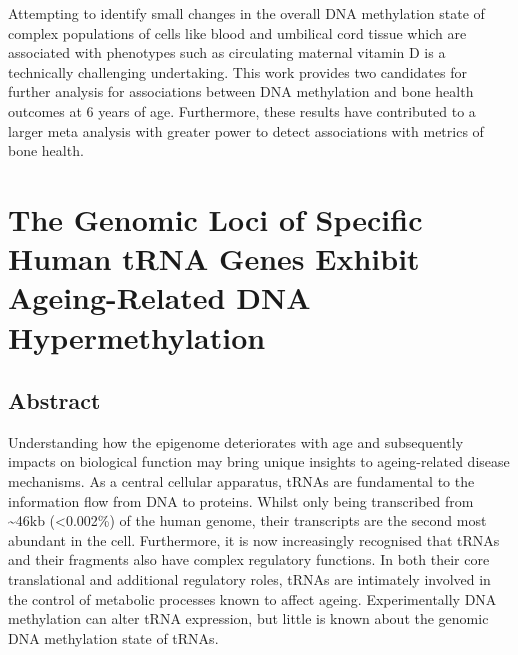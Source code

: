 \documentclass[
]{book}
\begin{document}
Attempting to identify small changes in the overall DNA methylation state of complex populations of cells like blood and umbilical cord tissue which are associated with phenotypes such as circulating maternal vitamin D is a technically challenging undertaking.
This work provides two candidates for further analysis for associations between DNA methylation and bone health outcomes at 6 years of age.
Furthermore, these results have contributed to a larger meta analysis with greater power to detect associations with metrics of bone health.

\hypertarget{tRNAs}{%
\chapter{The Genomic Loci of Specific Human tRNA Genes Exhibit Ageing-Related DNA Hypermethylation}\label{tRNAs}}

\hypertarget{tRNA-abstract}{%
\section{Abstract}\label{tRNA-abstract}}

Understanding how the epigenome deteriorates with age and subsequently impacts on biological function may bring unique insights to ageing-related disease mechanisms. As a central cellular apparatus, tRNAs are fundamental to the information flow from DNA to proteins.
Whilst only being transcribed from \textasciitilde46kb (\textless0.002\%) of the human genome, their transcripts are the second most abundant in the cell.
Furthermore, it is now increasingly recognised that tRNAs and their fragments also have complex regulatory functions.
In both their core translational and additional regulatory roles, tRNAs are intimately involved in the control of metabolic processes known to affect ageing.
Experimentally DNA methylation can alter tRNA expression, but little is known about the genomic DNA methylation state of tRNAs.
\end{document}
